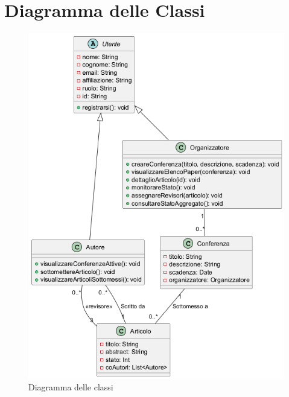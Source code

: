 \section{Diagramma delle Classi}

\begin{figure}[!ht]
  \centering
  \includegraphics[width=\linewidth]{./VisualParadigm/diagramma_classi.png}
  \caption{Diagramma delle classi}
  \label{fig:diagramma_classi}
\end{figure}
